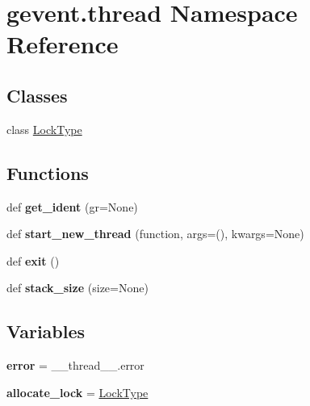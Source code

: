\hypertarget{namespacegevent_1_1thread}{}\section{gevent.\+thread Namespace Reference}
\label{namespacegevent_1_1thread}
\subsection*{Classes}
\begin{DoxyCompactItemize}
\item 
class \hyperlink{classgevent_1_1thread_1_1_lock_type}{Lock\+Type}
\end{DoxyCompactItemize}
\subsection*{Functions}
\begin{DoxyCompactItemize}
\item 
\mbox{\label{namespacegevent_1_1thread_afd8f29465befaedc37159697608b0609}} 
def {\bfseries get\+\_\+ident} (gr=None)
\item 
\mbox{\label{namespacegevent_1_1thread_afcf5ee273844a9c78f8d6b728a01fa9c}} 
def {\bfseries start\+\_\+new\+\_\+thread} (function, args=(), kwargs=None)
\item 
\mbox{\label{namespacegevent_1_1thread_a949ab53e180f1ff6b7fb31703c8fdae2}} 
def {\bfseries exit} ()
\item 
\mbox{\label{namespacegevent_1_1thread_af7be28bda46a8d70e859ae1c7337c435}} 
def {\bfseries stack\+\_\+size} (size=None)
\end{DoxyCompactItemize}
\subsection*{Variables}
\begin{DoxyCompactItemize}
\item 
\mbox{\label{namespacegevent_1_1thread_a82f3f6f574611f71a97916253630a080}} 
{\bfseries error} = \+\_\+\+\_\+thread\+\_\+\+\_\+.\+error
\item 
\mbox{\label{namespacegevent_1_1thread_aa2ba632e9b010fa057e254487fd3d93c}} 
{\bfseries allocate\+\_\+lock} = \hyperlink{classgevent_1_1thread_1_1_lock_type}{Lock\+Type}
\end{DoxyCompactItemize}


